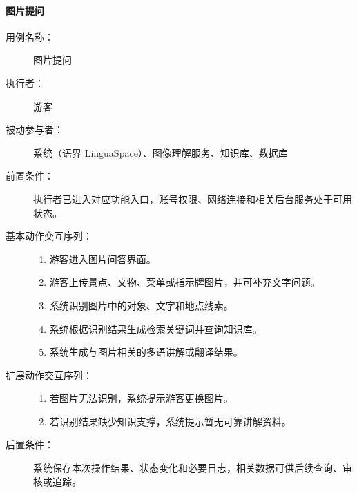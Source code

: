 \paragraph{图片提问}
\begin{description}
  \item[用例名称：] 图片提问
  \item[执行者：] 游客
  \item[被动参与者：] 系统（语界 LinguaSpace）、图像理解服务、知识库、数据库
  \item[前置条件：] 执行者已进入对应功能入口，账号权限、网络连接和相关后台服务处于可用状态。
  \item[基本动作交互序列：]
  \begin{enumerate}
    \item 游客进入图片问答界面。
    \item 游客上传景点、文物、菜单或指示牌图片，并可补充文字问题。
    \item 系统识别图片中的对象、文字和地点线索。
    \item 系统根据识别结果生成检索关键词并查询知识库。
    \item 系统生成与图片相关的多语讲解或翻译结果。
  \end{enumerate}
  \item[扩展动作交互序列：]
  \begin{enumerate}
    \item[3a.] 若图片无法识别，系统提示游客更换图片。
    \item[4a.] 若识别结果缺少知识支撑，系统提示暂无可靠讲解资料。
  \end{enumerate}
  \item[后置条件：] 系统保存本次操作结果、状态变化和必要日志，相关数据可供后续查询、审核或追踪。
\end{description}

